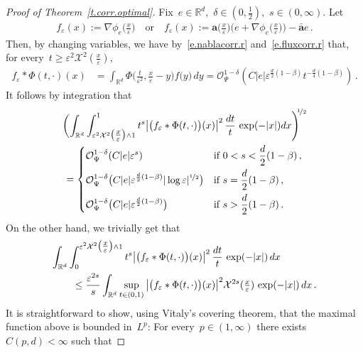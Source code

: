 \documentclass[11pt,twoside]{article} %
\numberwithin{equation}{section}
\theoremstyle{definition}
\let\originalleft\left
\let\originalright\right
\renewcommand{\left}{\mathopen{}\mathclose\bgroup\originalleft}
\renewcommand{\right}{\aftergroup\egroup\originalright}
\newcommand*{\R}{\ensuremath{\mathbb{R}}}
\newcommand{\eps}{\varepsilon}
\newcommand{\ep}{\eps}
\renewcommand{\a}{\mathbf{a}}
\newcommand{\ahom}{\bar{\a}}
\newcommand{\X}{\mathcal{X}}
\renewcommand{\O}{\mathcal{O}}
\begin{document}
\begin{proof}[Proof of Theorem~\ref{t.corr.optimal}]
Fix~$e \in \R^d$,~$\delta \in (0,\frac12)$,~$s \in (0,\infty)$. Let  
\begin{align*}  
f_\ep(x) := \nabla \phi_e\bigl( \tfrac{x}{\ep} \bigr)  
\quad \mbox{or} \quad 
f_\ep(x) :=  \a\bigl( \tfrac{x}{\ep} \bigr) \bigl( e + \nabla \phi_e\bigl( \tfrac{x}{\ep} \bigr) \bigr) - \ahom e \,.
\end{align*}
Then, by changing variables, we have by~\eqref{e.nablacorr.r} and~\eqref{e.fluxcorr.r} that, for every~$t \geq \ep^2 \X^2(\tfrac x\ep)$, 
\begin{align*}  
f_\ep\ast \Phi(t,\cdot) (x) 
& 
= 
\int_{\R^d} \Phi\bigl( \tfrac{t}{\ep^2} , \tfrac{x}{\ep} - y \bigr) f\bigl( y \bigr) \, dy 
=
 \O_{\Psi}^{1-\delta} (C |e| \ep^{\frac d2(1-\beta)} t^{-\frac d4(1-\beta)})
 \,.
\end{align*}
It follows by integration that 
\begin{multline}  \label{e.corr.bounds.pre}
\biggl( 
\int_{\R^d} \int_{\ep^2 \X^2\bigl(\tfrac x\ep\bigr) \wedge 1}^1 t^s   \big| \bigl( f_\ep  \ast \Phi(t,\cdot) \bigr) (x) \big|^2 \, \frac{dt}{t} \, \exp(-|x|)dx
\Biggr)^{\!\!\nicefrac12} 
\\
= 
\left\{
\begin{aligned}
& \O_{\Psi}^{1-\delta} (C |e| \ep^s) & \mbox{if} & \ 0 < s < \frac{d}{2}(1-\beta)\,,\\
&\O_{\Psi}^{1-\delta}  \bigl( C  |e| \ep^{\frac d2(1-\beta)} | \log \ep|^{\nicefrac12} \bigr) & \mbox{if} & \ s = \frac{d}{2}(1-\beta) \,, \\
&\O_{\Psi}^{1-\delta} \bigl( C |e| \ep^{\frac d2(1-\beta)} \bigr) & \mbox{if} & \ s > \frac{d}{2}(1-\beta) \,.
\end{aligned}
\right.
\end{multline}
On the other hand, we trivially get that
\begin{align} \notag  
\lefteqn{
\int_{\R^d} \int_{0}^{\ep^2 \X^2\bigl(\tfrac x\ep\bigr) \wedge 1} t^s   \big| \bigl( f_\ep  \ast \Phi(t,\cdot) \bigr) (x) \big|^2 \, \frac{dt}{t} \, \exp(-|x|) \, dx 
} \qquad &
\\ 
\notag &
\leq 
\frac{\ep^{2s}}s \int_{\R^d} \sup_{t \in (0,1)}  \big| \bigl( f_\ep \ast \Phi(t,\cdot) \bigr) (x) \big|^2 \X^{2s}(\tfrac x\ep) 
\, \exp(-|x|) \, dx 
\,.
\end{align}
It is straightforward to show, using Vitaly's covering theorem, that the maximal function above is bounded in~$L^p$: For every~$p \in (1,\infty)$ there exists~$C(p,d)<\infty$ such that 

\end{proof}
\end{document}
